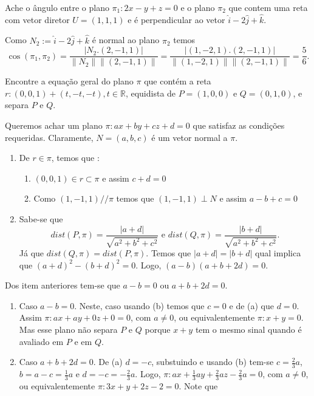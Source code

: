 \documentclass[11pt]{exam}
\begin{document}
	\begin{questions}
		\question[20] Ache o ângulo entre o plano 
		$\pi_1: 2x-y+z=0$ e o plano $\pi_2$ que contem
		uma reta com vetor diretor $U=(1,1,1)$
		e é perpendicular ao vetor  $\hat{i}-2\hat{j}+\hat{k}$.
		\begin{solution}
			Como  $N_2:=\hat{i}-2\hat{j}+\hat{k}$ é normal ao plano $\pi_2$
			temos 
			$$
			\cos(\pi_1,\pi_2)=
			\frac{|N_{2}.(2,-1,1)|}{\|N_2\|\|(2,-1,1)\|}=
			\frac{|(1,-2,1).(2,-1,1)|}{\|(1,-2,1)\|\|(2,-1,1)\|}=
			\frac{5}{6}.
			$$ 
		\end{solution}
		\question[20] Encontre a equação geral do plano
		$\pi$ que contém a
		reta $r: (0,0,1)+(t,-t,-t), t \in \mathbb{R}$, 
		equidista de $P=(1,0,0)$ e $Q=(0,1,0)$, 
		e separa $P$ e $Q$.
		\begin{solution}
			Queremos achar um plano $\pi: ax+by+cz+d=0$ que satisfaz as condições
			requeridas. Claramente, $N=(a,b,c)$ é um vetor normal a $\pi$.
			\begin{enumerate}
				\item De $r \in \pi$, temos que :
				\begin{enumerate}
					\item $(0,0,1) \in r \subset \pi$ e assim $c+d=0$
					\item Como $(1,-1,1) // \pi$ temos que 
					$(1,-1,1)\perp N$ e assim $a-b+c=0$
				\end{enumerate}
				\item Sabe-se que 
				$$
				dist(P,\pi)=\frac{|a+d|}{\sqrt{a^{2}+b^2+c^2}} \text{ e }
				dist(Q,\pi)=\frac{|b+d|}{\sqrt{a^{2}+b^2+c^2}}.
				$$ 
				Já que 
				$dist(Q,\pi)=dist(P,\pi)$. Temos que $|a+d|=|b+d|$ qual implica que 
				$(a+d)^{2}-(b+d)^2=0$. Logo, $(a-b)(a+b+2d)=0$.
			\end{enumerate}
			Dos item anteriores tem-se que $a-b=0$ ou $a+b+2d=0$.
			\begin{enumerate}
				\item Caso $a-b=0$. Neste, caso usando (b) 
				temos que $c=0$ e de (a) que $d=0$. 
				Assim $\pi: ax+ay+0z+0=0$, com $a\neq0$, ou equivalentemente 
				$\pi: x+y=0$. Mas esse plano não separa $P$ e $Q$ porque $x+y$ tem o mesmo sinal quando é avaliado em $P$ e em $Q$.  
				\item Caso $a+b+2d=0$. De (a) $d=-c$, substuindo e usando (b) tem-se 
				$c=\frac{2}{3}a$, $b=a-c=\frac{1}{3}a$ e $d=-c=-\frac{2}{3}a$.
				Logo, $\pi: ax+\frac{1}{3}ay+\frac{2}{3}az-\frac{2}{3}a=0$, com $a\neq0$, ou equivalentemente 
				$\pi: 3x+y+2z-2=0$. Note que 

\end{enumerate}
\end{solution}
\end{questions}
\end{document}
